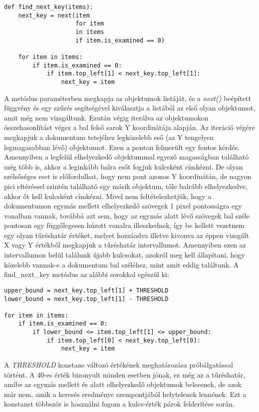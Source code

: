 \documentclass[12pt]{report}
\begin{document}
\newpage

\begin{verbatim}
def find_next_key(items):
    next_key = next(item 
                    for item 
                    in items 
                    if item.is_examined == 0)

    for item in items:
        if item.is_examined == 0:
            if item.top_left[1] < next_key.top_left[1]:
                next_key = item
\end{verbatim}

A metódus paraméterben megkapja az objektumok listáját, és a \emph{next()} beépített függvény és egy szűrés segítségével kiválasztja a listából az első olyan objektumot, amit még nem vizsgáltunk. Ezután végig iterálva az objektumokon összehasonlítást végez a bal felső sarok Y koordinátája alapján. Az iteráció végére megkapjuk a dokumentum tetejéhez legközelebb eső (az Y tengelyen legmagasabban lévő) objektumot.
Ezen a ponton felmerült egy fontos kérdés. Amennyiben a legfelül elhelyezkedő objektummal egyező magasságban található még több is, akkor a leginkább balra esőt fogjuk kulcsként címkézni. De olyan szélsőséges eset is előfordulhat, hogy nem pont azonos Y koordinátán, de nagyon pici eltéréssel szintén található egy másik objektum, tőle balrább elhelyezkedve, akkor őt kell kulcsként címkézni.
Mivel nem feltételezhetjük, hogy a dokumentumon egymás mellett elhelyezkedő szövegek 1 pixel pontosságra egy vonalban vannak, továbbá azt sem, hogy az egymás alatt lévő szövegek bal széle pontosan egy függőlegesen húzott vonalra illeszkednek, így be kellett vezetnem egy olyan tűréshatár értéket, melyet hozzáadva illetve kivonva az éppen vizsgált X vagy Y értékből megkapjuk a tűréshatár intervallumot.
Amennyiben ezen az intervallumon belül találunk újabb kulcsokat, azokról meg kell állapítani, hogy közelebb vannak-e a dokumentum bal széléhez, mint amit eddig találtunk. A find\_next\_key metódus az alábbi sorokkal egészül ki:

\begin{verbatim}
upper_bound = next_key.top_left[1] + THRESHOLD
lower_bound = next_key.top_left[1] - THRESHOLD

for item in items:
    if item.is_examined == 0:
        if lower_bound <= item.top_left[1] <= upper_bound:
            if item.top_left[0] < next_key.top_left[0]:
                next_key = item
\end{verbatim}

\newpage

A \emph{THRESHOLD} konstans változó értékének meghatározása próbálgatással történt. A 40-es érték bizonyult minden esetben jónak, ez még az a tűréshatár, amibe az egymás mellett és alatt elhelyezkedő objektumok beleesnek, de azok már nem, amik a keresés eredménye szempontjából helytelenek lennének. Ezt a konstanst többször is használni fogom a kulcs-érték párok felderítése során.
\end{document}
